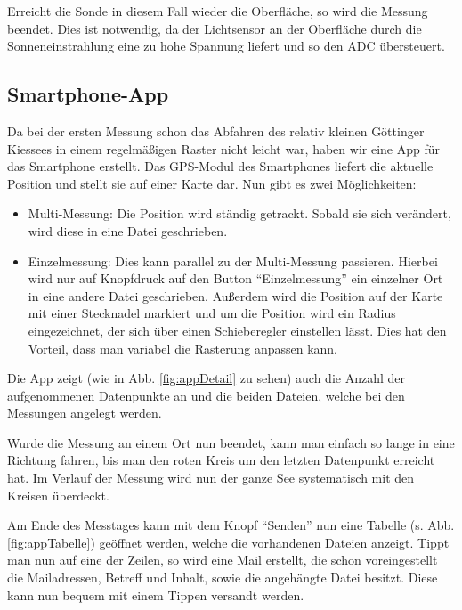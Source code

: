 \documentclass[12pt,a4paper,titlepage,headinclude,bibtotoc]{scrartcl}
\numberwithin{equation}{subsection}
\begin{document}
Erreicht die Sonde in diesem Fall wieder die Oberfläche, so wird die Messung beendet.
Dies ist notwendig, da der Lichtsensor an der Oberfläche durch die Sonneneinstrahlung eine zu hohe Spannung liefert und so den ADC übersteuert.

\subsection{Smartphone-App}
\label{sec:app}
Da bei der ersten Messung schon das Abfahren des relativ kleinen Göttinger Kiessees in einem regelmäßigen Raster nicht leicht war, haben wir eine App für das Smartphone erstellt.
Das GPS-Modul des Smartphones liefert die aktuelle Position und stellt sie auf einer Karte dar.
Nun gibt es zwei Möglichkeiten:
\begin{itemize}
	\item Multi-Messung: Die Position wird ständig getrackt.
		Sobald sie sich verändert, wird diese in eine Datei geschrieben.
	\item Einzelmessung: Dies kann parallel zu der Multi-Messung passieren.
		Hierbei wird nur auf Knopfdruck auf den Button "`Einzelmessung"' ein einzelner Ort in eine andere Datei geschrieben.
		Außerdem wird die Position auf der Karte mit einer Stecknadel markiert und um die Position wird ein Radius eingezeichnet, der sich über einen Schieberegler einstellen lässt.
		Dies hat den Vorteil, dass man variabel die Rasterung anpassen kann.
\end{itemize}

Die App zeigt (wie in Abb. \ref{fig:appDetail} zu sehen) auch die Anzahl der aufgenommenen Datenpunkte an und die beiden Dateien, welche bei den Messungen angelegt werden.

Wurde die Messung an einem Ort nun beendet, kann man einfach so lange in eine Richtung fahren, bis man den roten Kreis um den letzten Datenpunkt erreicht hat.
Im Verlauf der Messung wird nun der ganze See systematisch mit den Kreisen überdeckt.

Am Ende des Messtages kann mit dem Knopf "`Senden"' nun eine Tabelle (s. Abb. \ref{fig:appTabelle}) geöffnet werden, welche die vorhandenen Dateien anzeigt.
Tippt man nun auf eine der Zeilen, so wird eine Mail erstellt, die schon voreingestellt die Mailadressen, Betreff und Inhalt, sowie die angehängte Datei besitzt.
Diese kann nun bequem mit einem Tippen versandt werden.
\end{document}
